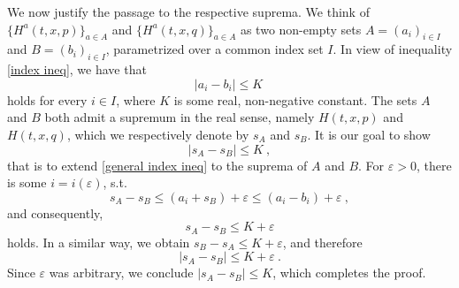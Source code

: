 We now justify the passage to the respective suprema. We think of $ \{H^a(t, x, p)\}_{a \in A} $ and $ \{H^{a}(t, x, q)\}_{a \in A} $ as two non-empty sets $ A = (a_i)_{i \in I} $ and $ B = (b_i)_{i \in I} $, parametrized over a common index set $ I $. In view of inequality \eqref{index ineq}, we have that
\begin{equation}
	\label{general index ineq}
	\lvert a_i  - b_i \rvert \leq K \ 
\end{equation}
holds for every $ i \in I $, where $ K $ is some real, non-negative constant. The sets $ A $ and $ B $ both admit a supremum in the real sense, namely $ H(t, x, p) $ and $ H(t, x, q) $, which we respectively denote by
$ s_A $ and $ s_B $. It is our goal to show
\begin{equation*}
\lvert s_A - s_B \rvert \leq K \ ,
\end{equation*}
that is to extend \ref{general index ineq} to the suprema of $ A $ and $ B $. For $ \varepsilon > 0 $, there is some $ i = i(\varepsilon) $, s.t.
\begin{equation*}
	s_A - s_B \leq (a_i + s_B) + \varepsilon \leq (a_i - b_i) + \varepsilon \ ,
\end{equation*}
and consequently,
\begin{equation*}
	s_A - s_B \leq K + \varepsilon 
\end{equation*}
holds. In a similar way, we obtain $ s_B - s_A \leq K + \varepsilon $, and therefore 
\begin{equation*}
	\lvert s_A - s_B \rvert \leq K + \varepsilon \ .
\end{equation*}
Since $ \varepsilon $ was arbitrary, we conclude $ \lvert s_A - s_B \rvert \leq K $, which completes the proof.